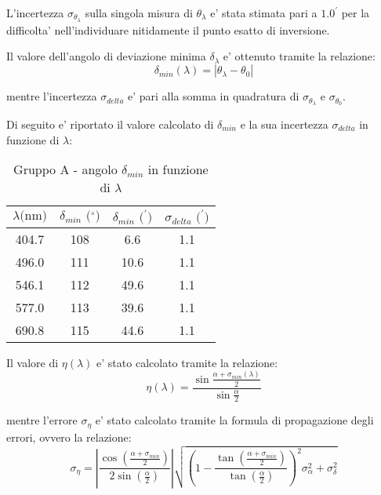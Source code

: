 L'incertezza $\sigma_{\theta_{\lambda}}$ sulla singola misura di $\theta_{\lambda}$ e' stata stimata pari a $1.0^{\prime}$ per la difficolta' nell'individuare nitidamente il punto esatto di inversione.

Il valore dell'angolo di deviazione minima $\delta_{\lambda}$ e' ottenuto tramite la relazione:
\[
    \delta_{min} (\lambda) = |\theta_{\lambda} - \theta_0|
\]

mentre l'incertezza $\sigma_{delta}$ e' pari alla somma in quadratura di $\sigma_{\theta_{\lambda}}$ e $\sigma_{\theta_0}$.

Di seguito e' riportato il valore calcolato di $\delta_{min}$ e la sua incertezza $\sigma_{delta}$ in funzione di $\lambda$:
\begin{table}[!htbp]
    {\par\centering
    \begin{tabular}{cccc}
        \hline
        $\lambda \text{(nm)}$ & 
        $\delta_{min} \text{ ($^{\circ}$)}$ & 
        $\delta_{min} \text{ ($^{\prime}$)}$ & 
        $\sigma_{delta} \text{ ($^{\prime}$)}$\\
        \hline
        404.7   &   108 &   6.6  & 1.1\\
        496.0   &   111 &   10.6 & 1.1\\
        546.1   &   112 &   49.6 & 1.1\\
        577.0   &   113 &   39.6 & 1.1\\
        690.8   &   115 &   44.6 & 1.1\\
        \hline
    \end{tabular}
    \par}
    \caption{Gruppo A - angolo $\delta_{min}$ in funzione di $\lambda$}
\end{table}

Il valore di $\eta (\lambda)$ e' stato calcolato tramite la relazione:
\[
    \eta (\lambda) = \frac{\sin{\frac{\alpha + \sigma_{min} (\lambda)}{2}}}{\sin{\frac{\alpha}{2}}}
\]

mentre l'errore $\sigma_{\eta}$ e' stato calcolato tramite la formula di propagazione degli errori, ovvero la relazione:
\[
    \sigma_{\eta} = 
        \left|
            \frac{
                \cos{\left( \frac{\alpha + \sigma_{min}}{2} \right)}
            }{
                2 \sin{\left( \frac{\alpha}{2} \right)}
            }
        \right|
        \sqrt{
            \left(
                1-\frac{
                    \tan{\left(
                        \frac{\alpha + \sigma_{min}}{2}
                    \right)
                }}{
                \tan{\left(
                    \frac{\alpha}{2}
                \right)}}
            \right)^2 \sigma_{\alpha}^2 + \sigma_{\delta}^2}
\]

